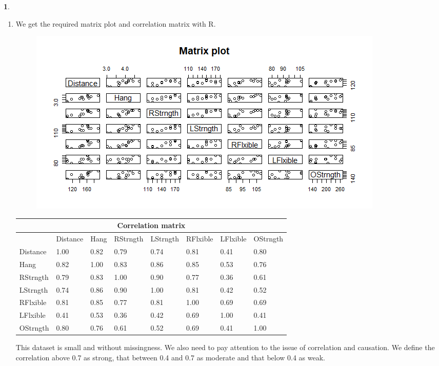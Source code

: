 \documentclass[10pt]{article}
\newtheorem{prob}{\bm{$Problem$}}
\begin{document}
\begin{prob}
\end{prob}
\begin{enumerate}[1)]
\vspace{3mm}

\item
We get the required matrix plot and correlation matrix with R.
\begin{figure}[H]
  \centering
  \includegraphics[scale=0.6]{p21b.png}
\end{figure}
\begin{table}[H]
\centering
\scriptsize
\begin{tabular}{llllllll}
\multicolumn{8}{c}{Correlation matrix}                                            \\ \hline
         & Distance & Hang & RStrngth & LStrngth & RFlxible & LFlxible & OStrngth \\
Distance & 1.00     & 0.82 & 0.79     & 0.74     & 0.81     & 0.41     & 0.80     \\
Hang     & 0.82     & 1.00 & 0.83     & 0.86     & 0.85     & 0.53     & 0.76     \\
RStrngth & 0.79     & 0.83 & 1.00     & 0.90     & 0.77     & 0.36     & 0.61     \\
LStrngth & 0.74     & 0.86 & 0.90     & 1.00     & 0.81     & 0.42     & 0.52     \\
RFlxible & 0.81     & 0.85 & 0.77     & 0.81     & 1.00     & 0.69     & 0.69     \\
LFlxible & 0.41     & 0.53 & 0.36     & 0.42     & 0.69     & 1.00     & 0.41     \\
OStrngth & 0.80     & 0.76 & 0.61     & 0.52     & 0.69     & 0.41     & 1.00
\end{tabular}
\end{table}
This dataset is small and without missingness. We also need to pay attention to the issue of correlation and causation. We define the correlation above 0.7 as strong, that between 0.4 and 0.7 as moderate and that below 0.4 as weak.\\

\end{enumerate}
\end{document}
